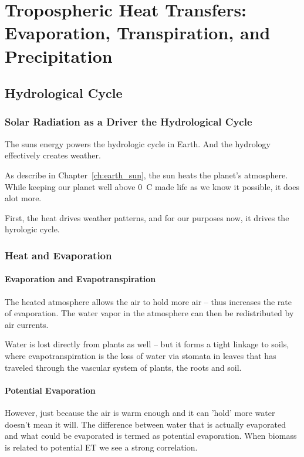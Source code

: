 \chapter[Tropospheric Heat Transfers]{Tropospheric Heat Transfers: Evaporation, Transpiration, and Precipitation}\label{ch:evapotranspiration}

\section{Hydrological Cycle}

\subsection{Solar Radiation as a Driver the Hydrological Cycle}

The suns energy powers the hydrologic cycle in Earth. And the hydrology effectively creates weather. 

As describe in Chapter~\ref{ch:earth_sun}, the sun heats the planet's atmosphere. While keeping our planet well above 0~\degree C made life as we know it possible, it does alot more. 

First, the heat drives weather patterns, and for our purposes now, it drives the hyrologic cycle.  

\subsection{Heat and Evaporation}

\subsubsection{Evaporation and Evapotranspiration}

The heated atmosphere allows the air to hold more air -- thus increases the rate of evaporation. The water vapor in the atmosphere can then be redistributed by air currents.

Water is lost directly from plants as well -- but it forms a tight linkage to soils, where evapotranspiration is the loss of water via stomata in leaves that has traveled through the vascular system of plants, the roots and soil. 

\subsubsection{Potential Evaporation}

However, just because the air is warm enough and it can 'hold' more water doesn't mean it will. The difference between water that is actually evaporated and what could be evaporated is termed as potential evaporation. When biomass is related to potential ET we see a strong correlation. 


